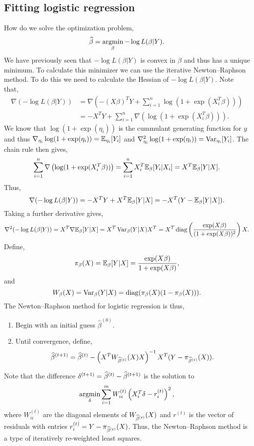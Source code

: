 \subsection{Fitting logistic regression}
How do we solve the optimization problem,
\[\widehat{\beta} = \operatorname*{argmin}_{\beta}-\log L(\beta|Y).  \]
We have previously seen that $-\log L(\beta|Y)$ is convex in $\beta$ and thus has a unique minimum. To calculate this minimizer we can use the iterative Newton--Raphson method. To do this we need to calculate the Hessian of $-\log L(\beta|Y)$. Note that,
\begin{align*}
    \nabla (-\log L(\beta|Y)) &=\nabla\left(-(X\beta)^TY+\sum_{i=1}^n \log(1+\exp(X_i^T\beta))\right)\\
    &=-X^TY+\sum_{i=1}^n \nabla\left(\log(1+\exp(X_i^T\beta))\right).
\end{align*}
We know that $\log(1+\exp(\eta_i))$ is the cummulant generating function for $y$ and thus $\nabla_{\eta_i}\log(1+\exp(\eta_i)) = {\mathbb{E}}_{\eta_i}[Y_i]$ and $\nabla_{\eta_i}^2 \log(1+\exp(\eta_i)) = \operatorname{Var}_{\eta_i}[Y_i]$. The chain rule then gives,
\[\sum_{i=1}^n \nabla\left(\log(1+\exp(X_i^T\beta))\right) = \sum_{i=1}^n X_i^T{\mathbb{E}}_{\beta}[Y_i|X_i] = X^T{\mathbb{E}}_\beta[Y|X]. \]
Thus,
\[ \nabla (-\log L(\beta|Y)) = -X^TY+X^T{\mathbb{E}}_\beta[Y|X]=-X^T(Y-{\mathbb{E}}_\beta[Y|X]). \]
Taking a further derivative gives,
\[\nabla^2(-\log L(\beta|Y)) = X^T\nabla {\mathbb{E}}_\beta[Y|X] = X^T \operatorname{Var}_{\beta}(Y|X)X^T = X^T \operatorname{diag}\left(\frac{\exp(X\beta)}{(1+\exp(X\beta))^2}\right)X. \]
Define,
\[\pi_\beta(X) = {\mathbb{E}}_\beta[Y|X] = \frac{\exp(X\beta)}{1+\exp(X\beta)},\]
and
\[W_\beta(X) = \operatorname{Var}_\beta(Y|X) = \operatorname{diag}(\pi_\beta(X)(1-\pi_\beta(X))). \]
The Newton--Raphson method for logistic regression is thus,
\begin{enumerate}
    \item Begin with an initial guess $\widehat{\beta}^{(0)}$.
    \item Until convergence, define, \[\widehat{\beta}^{(t+1)} = \widehat{\beta}^{(t)} - \left(X^T W_{\widehat{\beta}^{(t)}}(X) X\right)^{-1}X^T(Y-\pi_{\widehat{\beta}^{(t)}}(X)). \]
\end{enumerate}
Note that the difference $\delta^{(t+1)} = \widehat{\beta}^{(t)} - \widehat{\beta}^{(t+1)}$ is the solution to 
\[\operatorname*{argmin}_\delta \sum_{i=1}^m W_{ii}^{(t)}\left(X_i^T\delta - r_i^{(t)}\right)^2, \]
where $W_{ii}^{(t)}$ are the diagonal elements of $W_{\widehat{\beta}^{(t)}}(X)$ and $r^{(t)}$ is the vector of residuals with entries $r_i^{(t)} = Y-\pi_{\widehat{\beta}^{(t)}}(X)$. Thus, the Newton--Raphson method is a type of iteratively re-weighted least squares. 
